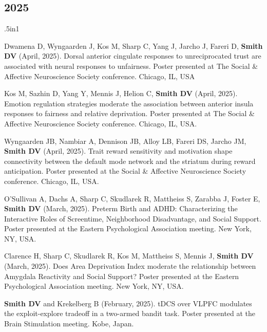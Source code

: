 \documentclass[11pt, letterpaper]{article}
\begin{document}
\subsection*{2025}
\begin{hangparas}{.5in}{1}

Dwamena D, Wyngaarden J, Kos M, Sharp C, Yang J, Jarcho J, Fareri D, \textbf{Smith DV} (April, 2025). Dorsal anterior cingulate responses to unreciprocated trust are associated with neural responses to unfairness. Poster presented at The Social \& Affective Neuroscience Society conference. Chicago, IL, USA

Kos M, Sazhin D, Yang Y, Mennis J, Helion C, \textbf{Smith DV} (April, 2025). Emotion regulation strategies moderate the association between anterior insula responses to fairness and relative deprivation. Poster presented at The Social \& Affective Neuroscience Society conference. Chicago, IL, USA.

Wyngaarden JB, Nambiar A, Dennison JB, Alloy LB, Fareri DS, Jarcho JM, \textbf{Smith DV} (April, 2025). Trait reward sensitivity and motivation shape connectivity between the default mode network and the striatum during reward anticipation. Poster presented at the Social \& Affective Neuroscience Society conference. Chicago, IL, USA.

O'Sullivan A, Dachs A, Sharp C, Skudlarek R, Mattheiss S, Zarabba J, Foster E, \textbf{Smith DV} (March, 2025). Preterm Birth and ADHD: Characterizing the Interactive Roles of Screentime, Neighborhood Disadvantage, and Social Support. Poster presented at the Eastern Psychological Association meeting. New York, NY, USA.

Clarence H, Sharp C, Skudlarek R, Kos M, Mattheiss S, Mennis J, \textbf{Smith DV} (March, 2025). Does Area Deprivation Index moderate the relationship between Amygdala Reactivity and Social Support? Poster presented at the Eastern Psychological Association meeting. New York, NY, USA.

\textbf{Smith DV} and Krekelberg B (February, 2025). tDCS over VLPFC modulates the exploit-explore tradeoff in a two-armed bandit task.  Poster presented at the Brain Stimulation meeting. Kobe, Japan. \\

\end{hangparas}
\end{document}
